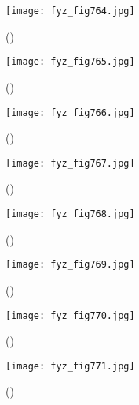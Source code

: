 {    \begin{figure}[ht!] %
      \centering
      \texttt{[image: fyz\_fig764.jpg]}
      \caption{
               (\cite[s.~707]{Feynman02})}
      \label{fyz_fig764}
    \end{figure}

    \begin{figure}[ht!] %
      \centering
      \texttt{[image: fyz\_fig765.jpg]}
      \caption{
               (\cite[s.~707]{Feynman02})}
      \label{fyz_fig765}
    \end{figure}
    
    \begin{figure}[ht!] %
      \centering
      \texttt{[image: fyz\_fig766.jpg]}
      \caption{
               (\cite[s.~707]{Feynman02})}
      \label{fyz_fig766}
    \end{figure}

    \begin{figure}[ht!] %
      \centering
      \texttt{[image: fyz\_fig767.jpg]}
      \caption{
               (\cite[s.~707]{Feynman02})}
      \label{fyz_fig767}
    \end{figure}

    \begin{figure}[ht!] %
      \centering
      \texttt{[image: fyz\_fig768.jpg]}
      \caption{
               (\cite[s.~707]{Feynman02})}
      \label{fyz_fig768}
    \end{figure}

    \begin{figure}[ht!] %
      \centering
      \texttt{[image: fyz\_fig769.jpg]}
      \caption{
               (\cite[s.~707]{Feynman02})}
      \label{fyz_fig769}
    \end{figure}

    \begin{figure}[ht!] %
      \centering
      \texttt{[image: fyz\_fig770.jpg]}
      \caption{
               (\cite[s.~707]{Feynman02})}
      \label{fyz_fig770}
    \end{figure}

    \begin{figure}[ht!] %
      \centering
      \texttt{[image: fyz\_fig771.jpg]}
      \caption{
               (\cite[s.~707]{Feynman02})}
      \label{fyz_fig771}
    \end{figure}

}
